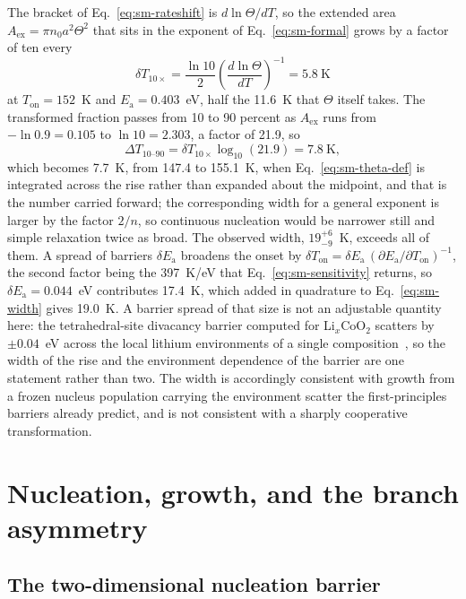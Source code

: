 \documentclass[reprint,twocolumn,prb,amsmath,amssymb,superscriptaddress,floatfix]{revtex4-2}
\newcommand{\Ea}{E_{\mathrm{a}}}
\newcommand{\Ton}{T_{\mathrm{on}}}
\begin{document}
The bracket of Eq.~\eqref{eq:sm-rateshift} is $d\ln\Theta/dT$, so the extended area
$A_{\mathrm{ex}}=\pi n_{0}a^{2}\Theta^{2}$ that sits in the exponent of
Eq.~\eqref{eq:sm-formal} grows by a factor of ten every
\begin{equation}
  \delta T_{10\times}=\frac{\ln10}{2}\left(\frac{d\ln\Theta}{dT}\right)^{-1}=5.8\ \mathrm{K}
  \label{eq:sm-decade}
\end{equation}
at $\Ton=152$~K and $\Ea=0.403$~eV, half the 11.6~K that $\Theta$ itself takes. The
transformed fraction passes from 10 to 90 percent as $A_{\mathrm{ex}}$ runs from
$-\ln0.9=0.105$ to $\ln10=2.303$, a factor of 21.9, so
\begin{equation}
  \Delta T_{10\text{--}90}=\delta T_{10\times}\log_{10}(21.9)=7.8\ \mathrm{K},
  \label{eq:sm-width}
\end{equation}
which becomes 7.7~K, from 147.4 to 155.1~K, when Eq.~\eqref{eq:sm-theta-def} is integrated
across the rise rather than
expanded about the midpoint, and that is the number carried forward; the corresponding width
for a general exponent is larger by the factor $2/n$, so continuous nucleation would be
narrower still and simple relaxation twice as broad. The observed width, $19^{+6}_{-9}$~K,
exceeds all of them. A spread of barriers $\delta\Ea$ broadens the onset by
$\delta\Ton=\delta\Ea\,(\partial\Ea/\partial\Ton)^{-1}$, the second factor being the 397~K/eV
that Eq.~\eqref{eq:sm-sensitivity} returns, so
$\delta\Ea=0.044$~eV contributes 17.4~K, which added in quadrature to
Eq.~\eqref{eq:sm-width} gives 19.0~K. A barrier spread of that size is not an adjustable
quantity here: the tetrahedral-site divacancy barrier computed for Li$_{x}$CoO$_{2}$ scatters by
$\pm0.04$~eV across the local lithium environments of a single
composition~\cite{VanderVen2001b}, so the width of the rise and the environment dependence of
the barrier are one statement rather than two. The width is accordingly consistent with growth
from a frozen nucleus population carrying the environment scatter the first-principles barriers
already predict, and is not consistent with a sharply cooperative transformation.

\section{Nucleation, growth, and the branch asymmetry}
\label{sec:kjma}

\subsection{The two-dimensional nucleation barrier}
\end{document}

